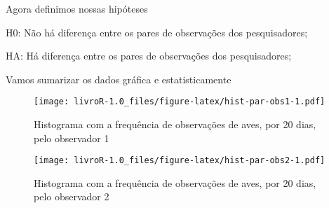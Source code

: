 \documentclass[]{book}
\newenvironment{Shaded}{\begin{snugshade}}{\end{snugshade}}
\newcommand{\DataTypeTok}[1]{\textcolor[rgb]{0.13,0.29,0.53}{#1}}
\newcommand{\DecValTok}[1]{\textcolor[rgb]{0.00,0.00,0.81}{#1}}
\newcommand{\KeywordTok}[1]{\textcolor[rgb]{0.13,0.29,0.53}{\textbf{#1}}}
\newcommand{\NormalTok}[1]{#1}
\newcommand{\OperatorTok}[1]{\textcolor[rgb]{0.81,0.36,0.00}{\textbf{#1}}}
\newcommand{\StringTok}[1]{\textcolor[rgb]{0.31,0.60,0.02}{#1}}
\begin{document}
Agora definimos nossas hipóteses

H0: Não há diferença entre os pares de observações dos pesquisadores;

HA: Há diferença entre os pares de observações dos pesquisadores;

Vamos sumarizar os dados gráfica e estatisticamente

\begin{Shaded}
\end{Shaded}

\begin{figure}
\centering
\texttt{[image: livroR-1.0\_files/figure-latex/hist-par-obs1-1.pdf]}
\caption{\label{fig:hist-par-obs1}Histograma com a frequência de observações de aves, por 20 dias, pelo observador 1}
\end{figure}

\begin{Shaded}
\end{Shaded}

\begin{figure}
\centering
\texttt{[image: livroR-1.0\_files/figure-latex/hist-par-obs2-1.pdf]}
\caption{\label{fig:hist-par-obs2}Histograma com a frequência de observações de aves, por 20 dias, pelo observador 2}
\end{figure}

\begin{Shaded}
\end{Shaded}
\end{document}
